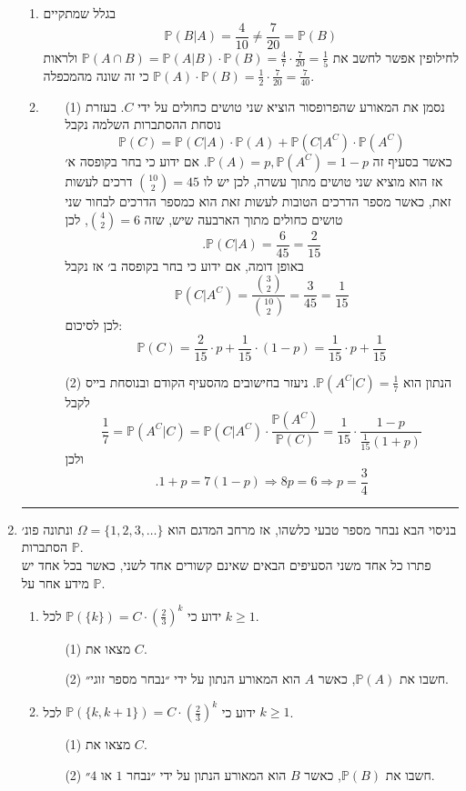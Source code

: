 \documentclass[12pt, a4paper]{article}
\newcommand{\PP}{\mathbb{P}}
\begin{document}
\begin{enumerate}
\begin{enumerate}
\item
בגלל שמתקיים
$$\PP(B|A)=\frac{4}{10}\neq \frac{7}{20}=\PP(B)$$
 לחילופין אפשר לחשב את
$\PP(A\cap B)=\PP(A|B)\cdot \PP(B)
=\frac{4}{7}\cdot \frac{7}{20}=\frac{1}{5}$
ולראות כי זה שונה מהמכפלה
$\PP(A)\cdot \PP(B)=\frac{1}{2}\cdot \frac{7}{20}=\frac{7}{40}$.
\item
\begin{enumerate}
\item[(1)]
נסמן את המאורע שהפרופסור הוציא שני טושים כחולים על ידי
$C$.
בעזרת נוסחת ההסתברות השלמה נקבל
$$\PP(C)=\PP(C|A)\cdot \PP(A)+\PP(C|A^C)\cdot \PP(A^C)$$
כאשר בסעיף זה
$\PP(A)=p, \PP(A^C)=1-p$. 
אם ידוע כי בחר בקופסה א׳ אז הוא מוציא שני טושים מתוך עשרה, לכן יש לו
$\binom{10}{2}=45$
דרכים לעשות זאת, כאשר מספר הדרכים הטובות לעשות זאת הוא כמספר הדרכים לבחור שני טושים כחולים מתוך הארבעה שיש, שזה
$\binom{4}{2}=6$,
לכן
$$.\PP(C|A)=\frac{6}{45}=\frac{2}{15}$$
באופן דומה, אם ידוע כי בחר בקופסה ב׳ אז נקבל
$$\PP(C|A^C)=\frac{\binom{3}{2}}{\binom{10}{2}}=\frac{3}{45}=\frac{1}{15}$$
לכן לסיכום:
$$\boxed{\PP(C)=\frac{2}{15}\cdot p+\frac{1}{15}\cdot (1-p)=\frac{1}{15}\cdot p+\frac{1}{15}}$$
\item[(2)]
הנתון הוא
$\PP(A^C|C)=\frac{1}{7}$.
ניעזר בחישובים מהסעיף הקודם ובנוסחת בייס לקבל
$$\frac{1}{7}=
\PP(A^C|C)
=\PP(C|A^C)\cdot
\frac{\PP(A^C)}{\PP(C)}
=\frac{1}{15}\cdot
\frac{1-p}{\frac{1}{15}(1+p)}$$
ולכן
$$.1+p=7(1-p)\Longrightarrow
8p=6\Longrightarrow 
\boxed{p=\frac{3}{4}}$$
\end{enumerate}
\end{enumerate}
\noindent\rule{15cm}{0.4pt}

\newpage

\item
בניסוי הבא נבחר מספר טבעי כלשהו, אז
מרחב המדגם הוא
$\Omega=\{1,2,3,\ldots\}$
ונתונה פונ׳ הסתברות
$\PP$.
\\
פתרו כל אחד משני הסעיפים הבאים שאינם קשורים אחד לשני, כאשר בכל אחד יש מידע אחר על
$\PP$.
\begin{enumerate}
\item
ידוע כי
$\PP(\{k\})=C\cdot
\left(
\frac{2}{3}\right)^k$
לכל
$k\ge1$.
\begin{enumerate}
\item[(1)]
מצאו את
$C$.
\item[(2)]
חשבו את 
$\PP(A)$,
כאשר
$A$
הוא המאורע הנתון על ידי ״נבחר מספר זוגי״.\\
\end{enumerate}
\item
ידוע כי
$\PP(\{k,k+1\})=C\cdot \left(\frac{2}{3}\right)^k$
לכל
$k\ge1$.
\begin{enumerate}
\item[(1)]
מצאו את
$C$.
\item[(2)]
חשבו את
$\PP(B)$,
כאשר
$B$
הוא המאורע הנתון על ידי
״נבחר 
$1$
או
$4$״.
\end{enumerate}
\end{enumerate}


\end{enumerate}
\end{document}
